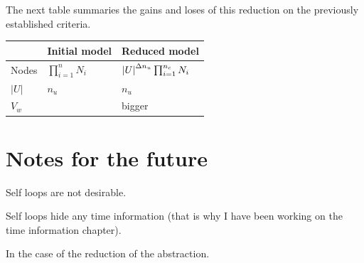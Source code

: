 The next table summaries the gains and loses of this reduction on the previously established criteria.

\begin{tabular}{ l|ll }
& Initial model & Reduced model\\ \hline
Nodes & $\prod_{i=1}^n N_i$ & $\left | U \right |^{\Delta n_u} \prod_{i=1}^{n_c} N_i $\\ 
$|U|$ & $n_u$ & $n_u$\\
$V_w$ &  & bigger \\
\end{tabular}

\section{Notes for the future}
Self loops are not desirable.

Self loops hide any time information (that is why I have been working on the time information chapter).

In the case of the reduction of the abstraction.

